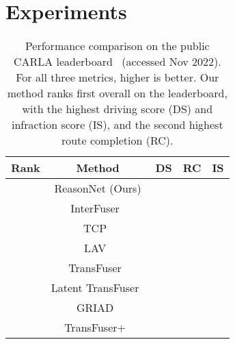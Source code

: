 \documentclass[10pt,twocolumn,letterpaper]{article}
\begin{document}
\section{Experiments}
\begin{table}[]
\begin{tabular}{l c c c c}
\toprule
    Rank & Method & DS  & RC  & IS  \\ \hline
     & ReasonNet (Ours) &  &  &   \\
     & InterFuser~\cite{shao2022safety}&  &  &   \\
     & TCP~\cite{wu2022trajectory} &  &  &   \\
     & LAV~\cite{chen2022learning} &  &  &   \\
     & TransFuser~\cite{chitta2022transfuser} &  &  &  \\
     & Latent TransFuser~\cite{chitta2022transfuser} &  &  &  \\
     & GRIAD~\cite{chekroun2021gri} &  &  &  \\
     & TransFuser+~\cite{jaeger2021master} &  &  &  \\
\bottomrule
\end{tabular}
\vspace{-0.5em}
\caption{Performance comparison on the public CARLA leaderboard~\cite{leaderboard} (accessed Nov 2022). For all three metrics, higher is better. Our method ranks first overall on the leaderboard, with the highest driving score (DS) and infraction score (IS), and the second highest route completion (RC). }
\label{table:leaderboard}
\vspace{-1em}
\end{table}
\end{document}
